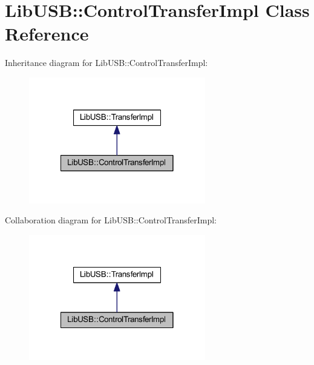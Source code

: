 \hypertarget{class_lib_u_s_b_1_1_control_transfer_impl}{\section{Lib\-U\-S\-B\-:\-:Control\-Transfer\-Impl Class Reference}
\label{class_lib_u_s_b_1_1_control_transfer_impl}
}


Inheritance diagram for Lib\-U\-S\-B\-:\-:Control\-Transfer\-Impl\-:
\nopagebreak
\begin{figure}[H]
\begin{center}
\leavevmode
\includegraphics[width=218pt]{class_lib_u_s_b_1_1_control_transfer_impl__inherit__graph}
\end{center}
\end{figure}


Collaboration diagram for Lib\-U\-S\-B\-:\-:Control\-Transfer\-Impl\-:
\nopagebreak
\begin{figure}[H]
\begin{center}
\leavevmode
\includegraphics[width=218pt]{class_lib_u_s_b_1_1_control_transfer_impl__coll__graph}
\end{center}
\end{figure}
